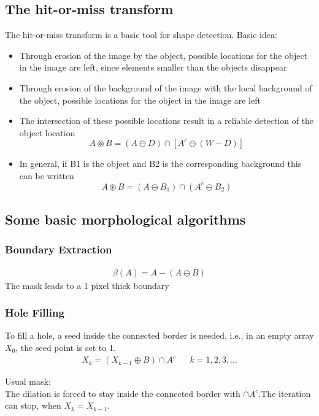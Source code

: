 \subsection{The hit-or-miss transform}
The hit-or-miss transform is a basic tool for shape detection. Basic idea:
\begin{itemize}
	\item Through erosion of the image by the object, possible locations for the object in the image are left, since elements smaller than the objects disappear

	\item Through erosion of the background of the image with the local background of the object, possible locations for the object in the image are left

	\item The intersection of these possible locations result in a reliable  detection of the object location
	\[
		A \circledast B = (A \ominus D) \cap [ A^c \ominus (W-D)]
	\]

	\item In general, if B1 is the object and B2 is the corresponding background this can be written
	\[
		A \circledast B = (A \ominus B_1)\cap (A^c \ominus B_2)
	\]
\end{itemize}


\subsection{Some basic morphological algorithms}
\subsubsection{Boundary Extraction}
\begin{multicols}{2}
	\begin{align*}
		\beta(A)=A-(A\ominus B)
	\end{align*}
	The mask \quad {}
	\quad leads to a 1 pixel thick boundary
\end{multicols}

\subsubsection{Hole Filling}
\begin{multicols}{2}
To fill a hole, a seed inside the connected border is needed, i.e., in an empty array $X_0$, the seed point is set to 1.
\begin{align*}
X_k=(X_{k-1}\oplus B)\cap A^c && k=1,2,3,\ldots
\end{align*}

Usual mask:  \\

The dilation is forced to stay inside the connected border with $\cap A^c$.The iteration can stop, when $X_k = X_{k-1}$.
\end{multicols}

